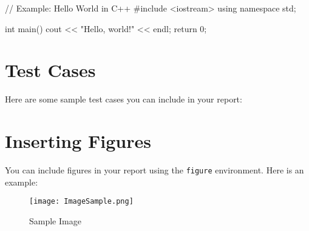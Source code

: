 \documentclass{../LatexStyle/style}
\begin{document}
\begin{codelisting}
// Example: Hello World in C++
#include <iostream>
using namespace std;

int main() {
    cout << "Hello, world!" << endl;
    return 0;
}
\end{codelisting}

\section{Test Cases}
Here are some sample test cases you can include in your report:
\begin{testcase}
\end{testcase}

\section{Inserting Figures}
You can include figures in your report using the \texttt{figure} environment. Here is an example:   
\begin{figure}[h]
    \centering
    \texttt{[image: ImageSample.png]} %
    \caption{Sample Image}
    \label{fig:sample-figure}
\end{figure}
\end{document}
